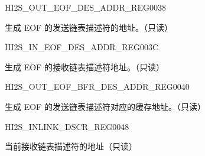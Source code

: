 \begin{register}{H}{I2S\_OUT\_EOF\_DES\_ADDR\_REG}{\hexprefix{}0038}\label{regdesc:I2SOUTEOFDESADDRREG}
%
\regnewline%
\begin{regdesc}\begin{reglist}
\label{fielddesc:I2SOUTEOFDESADDR}\item [I2S\_OUT\_EOF\_DES\_ADDR] 生成 EOF 的发送链表描述符的地址。（只读）
\end{reglist}\end{regdesc}
\end{register}


\begin{register}{H}{I2S\_IN\_EOF\_DES\_ADDR\_REG}{\hexprefix{}003C}\label{regdesc:I2SINEOFDESADDRREG}
%
\regnewline%
\begin{regdesc}\begin{reglist}
\label{fielddesc:I2SINSUCEOFDESADDR}\item [I2S\_IN\_SUC\_EOF\_DES\_ADDR] 生成 EOF 的接收链表描述符地址。（只读）
\end{reglist}\end{regdesc}
\end{register}


\begin{register}{H}{I2S\_OUT\_EOF\_BFR\_DES\_ADDR\_REG}{\hexprefix{}0040}\label{regdesc:I2SOUTEOFBFRDESADDRREG}
%
\regnewline%
\begin{regdesc}\begin{reglist}
\label{fielddesc:I2SOUTEOFBFRDESADDR}\item [I2S\_OUT\_EOF\_BFR\_DES\_ADDR] 生成 EOF 的发送链表描述符对应的缓存地址。（只读）
\end{reglist}\end{regdesc}
\end{register}


\begin{register}{H}{I2S\_INLINK\_DSCR\_REG}{\hexprefix{}0048}\label{regdesc:I2SINLINKDSCRREG}
%
\regnewline%
\begin{regdesc}\begin{reglist}
\label{fielddesc:I2SINLINKDSCR}\item [I2S\_INLINK\_DSCR] 当前接收链表描述符的地址（只读）
\end{reglist}\end{regdesc}
\end{register}


